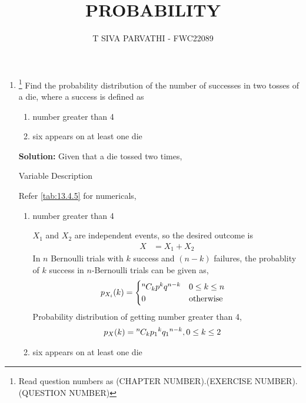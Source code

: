 \documentclass{article}
\newcommand{\solution}{\noindent \textbf{Solution: }}
\newcommand*{\permcomb}[4][0mu]{{{}^{#3}\mkern#1#2_{#4}}}
\newcommand*{\comb}[1][-1mu]{\permcomb[#1]{C}}
\begin{document}
\title{PROBABILITY}
\author{\Large T SIVA PARVATHI - FWC22089}
\date{}

\maketitle
\begin{enumerate}[label=13.\arabic{enumi}.\arabic{enumii}]%
\setcounter{enumi}{3}
\setcounter{enumii}{5}

\item \footnote{Read question numbers as (CHAPTER NUMBER).(EXERCISE NUMBER).(QUESTION NUMBER)}
Find the probability distribution of the number of successes in two tosses of a die, where a success is defined as
\begin{enumerate}
\item number greater than 4
\item six appears on at least one die
\end{enumerate}

\solution
Given that a die tossed two times,
\begin{table}[h]\centering
	
	 \caption{Variable Description}
	 \label{tab:13.4.5}
\end{table}

Refer \ref{tab:13.4.5} for numericals,
\begin{enumerate}
\item number greater than 4

$X_1$ and $X_2$ are independent events, so the desired outcome is
\begin{align}
X&=X_1+X_2
\end{align}
In $n$ Bernoulli trials with $k$ success and $(n - k)$ failures, the probablity of $k$ success in $n$-Bernoulli trials can be given as,
\begin{align}
p_{X_i}(k)   &= 
\begin{cases}
\comb{n}{k}{p}^{k}{q}^{n-k} & 0 \le k \le n\\
0 & \text{otherwise}                
\end{cases}
\end{align}
Probability distribution of getting number greater than 4,
\begin{align}
p_X(k)   &= \comb{n}{k}{p_1}^{k}{q_1}^{n-k}, 0 \le k \le 2
\end{align}
\item six appears on at least one die


\end{enumerate}
\end{enumerate}
\end{document}
